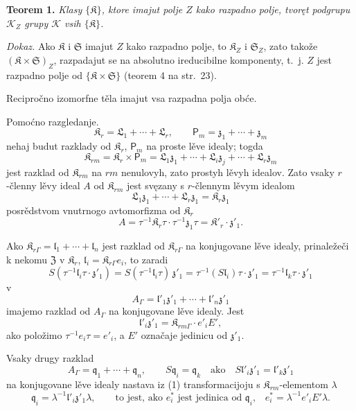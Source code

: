 \documentclass[11pt]{article}
\begin{document}
\textbf{Teorem 1.} \emph{Klasy \(\{\mathfrak K\}\), ktore imajut polje \(Z\) kako razpadno polje, tvoręt podgrupu \(\mathscr K_Z\) grupy \(\mathscr K\) vsih \(\{\mathfrak K\}\).}

\emph{Dokaz.} Ako \(\mathfrak K\) i \(\mathfrak S\) imajut \(Z\) kako razpadno polje, to \(\mathfrak K_Z\) i \(\mathfrak S_Z\), zato takože \((\mathfrak K\times\mathfrak S)_Z\), razpadajut se na absolutno ireducibilne komponenty, t.~j. \(Z\) jest razpadno polje od \(\{\mathfrak K\times\mathfrak S\}\) (teorem 4 na str.~23).

Recipročno izomorfne těla imajut vsa razpadna polja obće.

Pomoćno razgledanje.
\[
\mathfrak K_r=\mathfrak L_1+\cdots+\mathfrak L_r,\qquad
\mathsf P_m=\mathfrak z_1+\cdots+\mathfrak z_m
\]
nehaj budut razklady od \(\mathfrak K_r\), \(\mathsf P_m\) na proste lěve idealy; togda
\[
\mathfrak K_{rm}=\mathfrak K_r\times\mathsf P_m
=\mathfrak L_1\mathfrak z_1+\cdots+\mathfrak L_i\mathfrak z_j+\cdots+\mathfrak L_r\mathfrak z_m
\]
jest razklad od \(\mathfrak K_{rm}\) na \(rm\) nenulovyh, zato prostyh lěvyh idealov. Zato vsaky \(r\)-členny lěvy ideal \(A\) od \(\mathfrak K_{rm}\) jest svęzany s \(r\)-člennym lěvym idealom
\[
\mathfrak L_1\mathfrak z_1+\cdots+\mathfrak L_r\mathfrak z_1=\mathfrak K_r\mathfrak z_1
\]
posrědstvom vnutrnogo avtomorfizma od \(\mathfrak K_r\)
\[
A=\tau^{-1}\mathfrak K_r\tau\cdot\tau^{-1}\mathfrak z_1\tau
=\mathfrak K'_r\cdot\mathfrak z'_1.
\]

Ako \(\mathfrak K_{r\Gamma}=\mathfrak l_1+\cdots+\mathfrak l_n\) jest razklad od \(\mathfrak K_{r\Gamma}\) na konjugovane lěve idealy, prinaležeči k nekomu \(\mathfrak Z\) v \(\mathfrak K_r\), \(\mathfrak l_i=\mathfrak K_{r\Gamma}e_i\), to zaradi
\[
S(\tau^{-1}\mathfrak l_i\tau\cdot\mathfrak z'_1)
=S(\tau^{-1}\mathfrak l_i\tau)\,\mathfrak z'_1
=\tau^{-1}(S\mathfrak l_i)\tau\cdot\mathfrak z'_1
=\tau^{-1}\mathfrak l_k\tau\cdot\mathfrak z'_1
\]
v
\[
\tag{1}
A_\Gamma=\mathfrak l'_1\mathfrak z'_1+\cdots+\mathfrak l'_n\mathfrak z'_1
\]
imajemo razklad od \(A_\Gamma\) na konjugovane lěve idealy. Jest
\[
\mathfrak l'_i\mathfrak z'_1=\mathfrak K_{rm\Gamma}\cdot e'_iE',
\]
ako položimo \(\tau^{-1}e_i\tau=e'_i\), a \(E'\) označaje jedinicu od \(\mathfrak z'_1\).

Vsaky drugy razklad
\[
\tag{2}
A_\Gamma=\mathfrak q_1+\cdots+\mathfrak q_n,\qquad
S\mathfrak q_i=\mathfrak q_k\quad\text{ako}\quad
S\mathfrak l'_i\mathfrak z'_1=\mathfrak l'_k\mathfrak z'_1
\]
na konjugovane lěve idealy nastava iz (1) transformacijoju s \(\mathfrak K_{rm}\)-elementom \(\lambda\)
\[
\mathfrak q_i=\lambda^{-1}\mathfrak l'_i\mathfrak z'_1\lambda,
\qquad
\text{to jest, ako \(e_i^*\) jest jedinica od \(\mathfrak q_i\),}\quad
e_i^*=\lambda^{-1}e'_iE'\lambda.
\]
\end{document}

